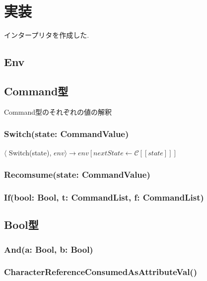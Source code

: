 \documentclass[uplatex,a4j]{jsreport}
\begin{document}
\chapter{実装}
インタープリタを作成した.
\section{Env}

\section{Command型}
Command型のそれぞれの値の解釈
\subsection*{Switch(state: CommandValue)}
$\langle$ Switch(state), $env \rangle \rightarrow env[nextState \leftarrow \mathcal{C}[\![state]\!] ]$
\subsection*{Recomsume(state: CommandValue)}
\subsection*{If(bool: Bool, t: CommandList, f: CommandList)}
\begin{prooftree}
\end{prooftree}
\begin{prooftree}
\end{prooftree}

\section{Bool型}
\subsection*{And(a: Bool, b: Bool)}
\subsection*{CharacterReferenceConsumedAsAttributeVal()}
\end{document}
